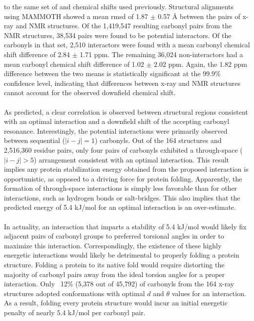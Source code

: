 \begin{doublespace}
to the same set of \cnmr{} and \nnmr{} chemical shifts used previously.
Structural alignments using MAMMOTH showed a mean rmsd of 1.87 $\pm$ 0.57 \r{A}
between the pairs of x-ray and NMR structures. Of the 1,419,547 resulting
carbonyl pairs from the NMR structures, 38,534 pairs were found to be potential
interactors. Of the carbonyls in that set, 2,510 interactors were found with a
mean carbonyl \cnmr{} chemical shift difference of 2.84 $\pm$ 1.71 ppm. The
remaining 36,024 non-interactors had a mean carbonyl \cnmr{} chemical shift
difference of 1.02 $\pm$ 2.02 ppm. Again, the 1.82 ppm difference between the
two means is statistically significant at the 99.9\% confidence level, 
indicating that differences between x-ray and NMR structures cannot account
for the observed downfield \cnmr{} chemical shift.
\\\\
As predicted, a clear correlation is observed between structural regions
consistent with an optimal \npistar{} interaction and a downfield shift of the
accepting carbonyl \cnmr{} resonance. Interestingly, the potential \npistar{}
interactions were primarily observed between sequential ($|i-j|=1$) carbonyls.
Out of the 164 structures and 2,516,360 residue pairs, only four pairs of
carbonyls exhibited a through-space ($|i-j| > 5$) arrangement consistent with
an optimal \npistar{} interaction. This result implies any protein
stabilization energy obtained from the proposed \npistar{} interaction is
opportunistic, as opposed to a driving force for protein folding. Apparently,
the formation of through-space \npistar{} interactions is simply less favorable
than for other interactions, such as hydrogen bonds or salt-bridges. This also
implies that the predicted energy of 5.4 kJ/mol for an optimal \npistar{}
interaction is an over-estimate.
\\\\
In actuality, an \npistar{} interaction that imparts a stability of 5.4 kJ/mol
would likely fix adjacent pairs of carbonyl groups to preferred torsional
angles in order to maximize this interaction. Correspondingly, the existence
of these highly energetic \npistar{} interactions would likely be detrimental
to properly folding a protein structure. Folding a protein to its native fold
would require distorting the majority of carbonyl pairs away from the ideal
torsion angles for a proper \npistar{} interaction. Only ~12\% (5,378 out of
45,792) of carbonyls from the 164 x-ray structures adopted conformations with
optimal $d$ and $\theta$ values for an \npistar{} interaction. As a result,
folding every protein structure would incur an initial energetic penalty of
nearly 5.4 kJ/mol per carbonyl pair.
\end{doublespace}

